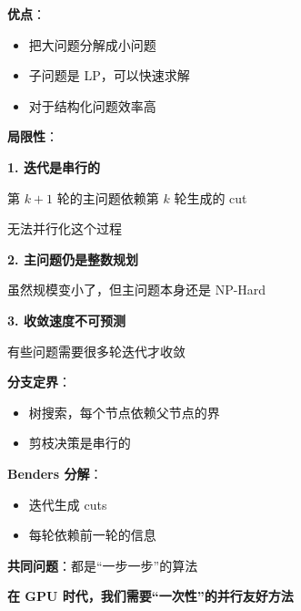 \documentclass[12pt, a4paper]{ctexart}
\begin{document}
\begin{blackboard}

\textbf{优点}：
\begin{itemize}
    \item 把大问题分解成小问题
    \item 子问题是 LP，可以快速求解
    \item 对于结构化问题效率高
\end{itemize}

\textbf{局限性}：

\textbf{1. 迭代是串行的}

第 $k+1$ 轮的主问题依赖第 $k$ 轮生成的 cut

无法并行化这个过程

\textbf{2. 主问题仍是整数规划}

虽然规模变小了，但主问题本身还是 NP-Hard

\textbf{3. 收敛速度不可预测}

有些问题需要很多轮迭代才收敛

\end{blackboard}

\begin{blackboard}[传统方法的共同困境]

\textbf{分支定界}：
\begin{itemize}
    \item 树搜索，每个节点依赖父节点的界
    \item 剪枝决策是串行的
\end{itemize}

\textbf{Benders 分解}：
\begin{itemize}
    \item 迭代生成 cuts
    \item 每轮依赖前一轮的信息
\end{itemize}

\textbf{共同问题}：都是``一步一步''的算法

\begin{center}
\end{center}

\textbf{在 GPU 时代，我们需要``一次性''的并行友好方法}

\end{blackboard}
\end{document}
